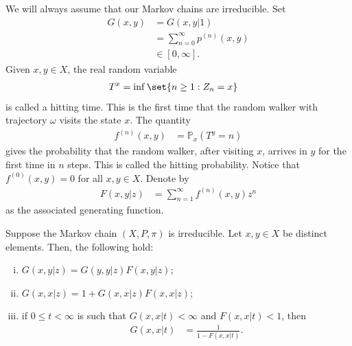\documentclass[10pt]{mypackage}
\begin{document}
We will always assume that our Markov chains are irreducible. Set
\begin{align*}
  G\left( x,y \right) &= G\left( x,y|1 \right)\\
                      &= \sum_{n=0}^{\infty}p^{(n)}\left( x,y \right)\\
                      &\in [0,\infty].
\end{align*}
Given $x,y\in X$, the real random variable
\begin{align*}
  T^{x} &= \inf\set{n\geq 1 : Z_n = x}
\end{align*}
is called a hitting time. This is the first time that the random walker with trajectory $\omega$ visits the state $x$. The quantity
\begin{align*}
  f^{(n)}\left( x,y \right) &= \mathbb{P}_x\left( T^{y} = n \right)
\end{align*}
gives the probability that the random walker, after visiting $x$, arrives in $y$ for the first time in $n$ steps. This is called the hitting probability. Notice that $f^{(0)}\left( x,y \right) = 0$ for all $x,y\in X$. Denote by
\begin{align*}
  F\left( x,y|z \right) &= \sum_{n=1}^{\infty}f^{(n)}\left( x,y \right)z^{n}
\end{align*}
as the associated generating function.
\begin{proposition}
  Suppose the Markov chain $\left( X,P,\pi \right)$ is irreducible. Let $x,y\in X$ be distinct elements. Then, the following hold:
  \begin{enumerate}[(i)]
    \item $G\left( x,y|z \right) = G\left( y,y|z \right)F\left( x,y|z \right)$;
    \item $G\left( x,x|z \right) = 1 + G\left( x,x|z \right)F\left( x,x|z \right)$;
    \item if $0\leq t < \infty$ is such that $G\left( x,x|t \right) < \infty$ and $F\left( x,x|t \right) < 1$, then
      \begin{align*}
        G\left( x,x|t \right) &= \frac{1}{1-F\left( x,x|t \right)}.
      \end{align*}
  \end{enumerate}
\end{proposition}
\end{document}
